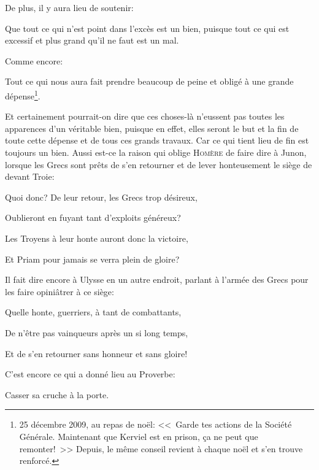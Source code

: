 \bigbreak

De plus, il y aura lieu de soutenir:

\begin{lieu}
	Que tout ce qui n'est point dans l’excès est un bien, puisque tout ce qui est excessif et plus grand qu'il ne
	faut est un mal.
\end{lieu}

\bigbreak

Comme encore:

\begin{lieu}
	Tout ce qui nous aura fait prendre beaucoup de peine et obligé à une grande dépense\footnote{25 décembre 2009,
	au repas de noël: <<~Garde tes actions de la Société Générale. Maintenant que Kerviel est en prison, ça ne peut
	que remonter!~>> Depuis, le même conseil revient à chaque noël et s'en trouve renforcé.}.
\end{lieu}

Et certainement pourrait-on dire que ces choses-là n'eussent pas toutes les apparences d'un véritable bien, puisque en
effet, elles seront le but et la fin de toute cette dépense et de tous ces grands travaux. Car ce qui tient lieu de fin
est toujours un bien. Aussi est-ce la raison qui oblige \textsc{Homère} de faire dire à Junon, lorsque les Grecs sont
prêts de s'en retourner et de lever honteusement le siège de devant Troie:

\begin{emphpar}
	Quoi donc? De leur retour, les Grecs trop désireux,
	
	Oublieront en fuyant tant d'exploits généreux?

	Les Troyens à leur honte auront donc la victoire,
	
	Et Priam pour jamais se verra plein de gloire?
\end{emphpar}

Il fait dire encore à Ulysse en un autre endroit, parlant à l'armée des Grecs pour les faire opiniâtrer à ce siège:

\begin{emphpar}
	Quelle honte, guerriers, à tant de combattants,

	De n'être pas vainqueurs après un si long temps,
	
	Et de s'en retourner sans honneur et sans gloire!
\end{emphpar}

C'est encore ce qui a donné lieu au Proverbe:

\begin{emphpar}
	Casser sa cruche à la porte. 
\end{emphpar}

